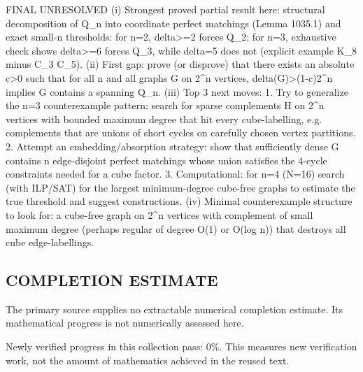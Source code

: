 FINAL
UNRESOLVED
(i) Strongest proved partial result here: structural decomposition of Q_n into coordinate perfect matchings (Lemma 1035.1) and exact small-n thresholds: for n=2, delta>=2 forces Q_2; for n=3, exhaustive check shows delta>=6 forces Q_3, while delta=5 does not (explicit example K_8 minus C_3 \cup C_5).
(ii) First gap: prove (or disprove) that there exists an absolute c>0 such that for all n and all graphs G on 2^n vertices, delta(G)>(1-c)2^n implies G contains a spanning Q_n.
(iii) Top 3 next moves:
  1. Try to generalize the n=3 counterexample pattern: search for sparse complements H on 2^n vertices with bounded maximum degree that hit every cube-labelling, e.g. complements that are unions of short cycles on carefully chosen vertex partitions.
  2. Attempt an embedding/absorption strategy: show that sufficiently dense G contains n edge-disjoint perfect matchings whose union satisfies the 4-cycle constraints needed for a cube factor.
  3. Computational: for n=4 (N=16) search (with ILP/SAT) for the largest minimum-degree cube-free graphs to estimate the true threshold and suggest constructions.
(iv) Minimal counterexample structure to look for: a cube-free graph on 2^n vertices with complement of small maximum degree (perhaps regular of degree O(1) or O(log n)) that destroys all cube edge-labellings.



\subsection*{COMPLETION ESTIMATE}
The primary source supplies no extractable numerical completion estimate. Its mathematical progress is not numerically assessed here.

Newly verified progress in this collection pass: $0\%$. This measures new verification work, not the amount of mathematics achieved in the reused text.
